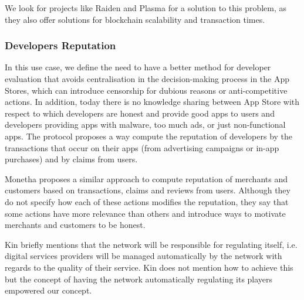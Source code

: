 We look for projects like Raiden and Plasma for a solution to this problem, as they also offer solutions for blockchain scalability and transaction times.

\subsubsection{Developers Reputation}

In this use case, we define the need to have a better method for developer evaluation that avoids centralisation in the decision-making process in the App Stores, which can introduce censorship for dubious reasons or anti-competitive actions. In addition, today there is no knowledge sharing between App Store with respect to which developers are honest and provide good apps to users and developers providing apps with malware, too much ads, or just non-functional apps. The protocol proposes a way compute the reputation of developers by the transactions that occur on their apps (from advertising campaigns or in-app purchases) and by claims from users.

Monetha proposes a similar approach to compute reputation of merchants and customers based on transactions, claims and reviews from users. Although they do not specify how each of these actions modifies the reputation, they say that some actions have more relevance than others and introduce ways to motivate merchants and customers to be honest.

Kin briefly mentions that the network will be responsible for regulating itself, i.e. digital services providers will be managed automatically by the network with regards to the quality of their service. Kin does not mention how to achieve this but the concept of having the network automatically regulating its players empowered our concept.

